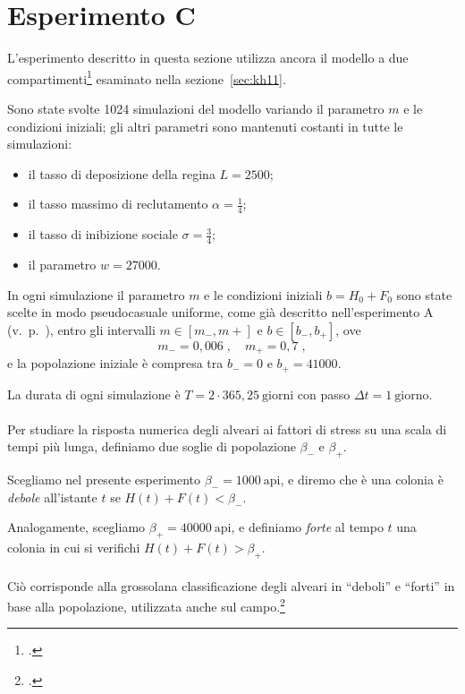 \section{Esperimento C}
L'esperimento descritto in questa sezione utilizza ancora il modello a due compartimenti\footcite{khoury2011}
esaminato nella sezione~\ref{sec:kh11}.

Sono state svolte 1024 simulazioni del modello variando il parametro $m$ e le condizioni iniziali;
gli altri parametri sono mantenuti costanti in tutte le simulazioni:
\begin{itemize}
    \item il tasso di deposizione della regina $L=2500$;
    \item il tasso massimo di reclutamento $\alpha = \frac{1}{4}$;
    \item il tasso di inibizione sociale $\sigma = \frac{3}{4}$;
    \item il parametro $w=27000$.
\end{itemize}

In ogni simulazione il parametro $m$ e le condizioni iniziali $b = H_0 + F_0$ sono state scelte
in modo pseudocasuale uniforme, come già descritto nell'esperimento A (v.~p.~\pageref{sec:esperimentoA}),
entro gli intervalli $m \in \left[ m_-, m+ \right]$ e $b \in \left[b_-, b_+ \right]$, ove
$$m_- =0,006 \; , \quad m_+ = 0,7 \; ,$$
e la popolazione iniziale è compresa tra $b_- =0$ e $b_+=41000$.

La durata di ogni simulazione è $T=2 \cdot 365,25~\text{giorni}$ con passo $\Delta t = 1~\text{giorno}$.

\paragraph{}
Per studiare la risposta numerica degli alveari ai fattori di stress su una scala di tempi più lunga,
definiamo due soglie di popolazione $\beta_-$ e $\beta_+$.

Scegliamo nel presente esperimento $\beta_- = 1000~\text{api}$, e diremo che è una colonia è \emph{debole}
all'istante $t$ se $H(t)+F(t)< \beta_-$.

Analogamente, scegliamo $\beta_+ = 40000~\text{api}$, e definiamo \emph{forte} al tempo $t$ una colonia in cui
si verifichi $H(t)+F(t)> \beta_+$.

\paragraph{}
Ciò corrisponde alla grossolana classificazione degli alveari in ``deboli'' e ``forti'' in base alla popolazione,
utilizzata anche sul campo.\footcite{privFDL,tesiFDL,meccanica}


